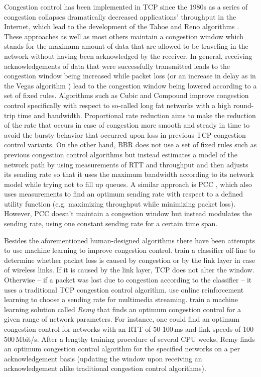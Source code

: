 \documentclass[newfonts=false,format=sigconf,10pt,letterpaper]{acmart}
\begin{document}
Congestion control has been implemented in TCP since the 1980s as a series of congestion collapses dramatically decreased applications' throughput in the Internet, which lead to the development of the Tahoe and Reno algorithms \cite{jacobson_congestion_1988}. These approaches as well as most others maintain a congestion window which stands for the maximum amount of data that are allowed to be traveling in the network without having been acknowledged by the receiver. In general, receiving acknowledgements of data that were successfully transmitted leads to the congestion window being increased while packet loss (or an increase in delay as in the Vegas algorithm \cite{brakmo_tcp_1995}) lead to the congestion window being lowered according to a set of fixed rules. Algorithms such as Cubic and Compound \cite{ha_cubic:_2008, tan_compound_2006} improve congestion control specifically with respect to so-called long fat networks with a high round-trip time and bandwidth. Proportional rate reduction \cite{dukkipati_proportional_2011} aims to make the reduction of the rate that occurs in case of congestion more smooth and steady in time to avoid the bursty behavior that occurred upon loss in previous TCP congestion control variants. On the other hand, BBR \cite{cardwell_bbr:_2016} does not use a set of fixed rules such as previous congestion control algorithms but instead estimates a model of the network path by using measurements of RTT and throughput and then adjusts its sending rate so that it uses the maximum bandwidth according to its network model while trying not to fill up queues. A similar approach is PCC \cite{dong_pcc:_2015}, which also uses measurements to find an optimum sending rate with respect to a defined utility function (e.g. maximizing throughput while minimizing packet loss). However, PCC doesn't maintain a congestion window but instead modulates the sending rate, using one constant sending rate for a certain time span.

Besides the aforementioned human-designed algorithms there have been attempts to use machine learning to improve congestion control. \citet{geurts_machine_2004} train a classifier off-line to determine whether packet loss is caused by congestion or by the link layer in case of wireless links. If it is caused by the link layer, TCP does not alter the window. Otherwise -- if a packet was lost due to congestion according to the classifier -- it uses a traditional TCP congestion control algorithm. \citet{shaio_reinforcement_2005} use online reinforcement learning to choose a sending rate for multimedia streaming. \citet{winstein_tcp_2013} train a machine learning solution called \textit{Remy} that finds an optimum congestion control for a given range of network parameters. For instance, one could find an optimum congestion control for networks with an RTT of 50-100\,ms and link speeds of 100-500\,Mbit/s. After a lengthy training procedure of several CPU weeks, Remy finds an optimum congestion control algorithm for the specified networks on a per acknowledgement basis (updating the window upon receiving an acknowledgement alike traditional congestion control algorithms). 
\end{document}

